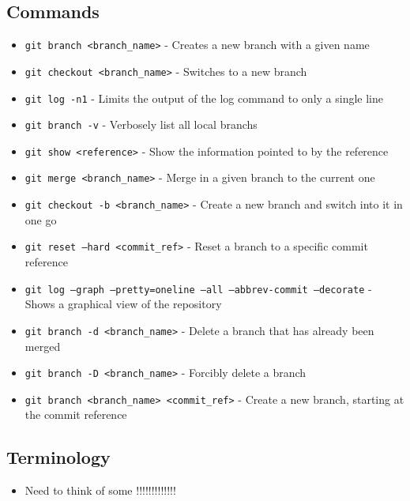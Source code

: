 \subsection{Commands}
\begin{itemize}
\item\texttt{git branch <branch\_name>} - Creates a new branch with a given name

\item\texttt{git checkout <branch\_name>} - Switches to a new branch

\item\texttt{git log -n1} - Limits the output of the log command to only a single line

\item\texttt{git branch -v} - Verbosely list all local branchs

\item\texttt{git show <reference>} - Show the information pointed to by the reference

\item\texttt{git merge <branch\_name>} - Merge in a given branch to the current one

\item\texttt{git checkout -b <branch\_name>} - Create a new branch and switch into it in one go

\item\texttt{git reset --hard <commit\_ref>} - Reset a branch to a specific commit reference

\item\texttt{git log --graph --pretty=oneline --all --abbrev-commit --decorate} - Shows a graphical view of the repository

\item\texttt{git branch -d <branch\_name>} - Delete a branch that has already been merged

\item\texttt{git branch -D <branch\_name>} - Forcibly delete a branch

\item\texttt{git branch <branch\_name> <commit\_ref>} - Create a new branch, starting at the commit reference

\end{itemize}

\subsection{Terminology}
\begin{itemize}
\item Need to think of some !!!!!!!!!!!!!
\end{itemize}
